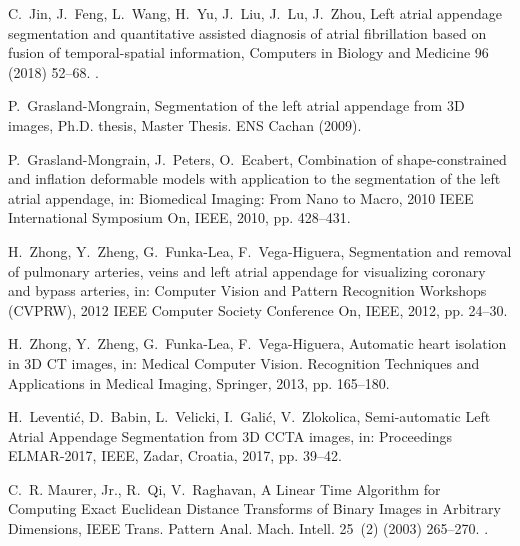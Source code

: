 \documentclass[review]{elsarticle}
\begin{document}
\begin{thebibliography}{10}
C.~Jin, J.~Feng, L.~Wang, H.~Yu, J.~Liu, J.~Lu, J.~Zhou, Left atrial appendage
  segmentation and quantitative assisted diagnosis of atrial fibrillation based
  on fusion of temporal-spatial information, Computers in Biology and Medicine
  96 (2018) 52--68.
\newblock \href {http://dx.doi.org/10.1016/j.compbiomed.2018.03.002}
  {}.

P.~{Grasland-Mongrain}, Segmentation of the left atrial appendage from {{3D}}
  images, Ph.D. thesis, Master Thesis. ENS Cachan (2009).

P.~{Grasland-Mongrain}, J.~Peters, O.~Ecabert, Combination of shape-constrained
  and inflation deformable models with application to the segmentation of the
  left atrial appendage, in: Biomedical {{Imaging}}: {{From Nano}} to
  {{Macro}}, 2010 {{IEEE International Symposium}} On, {IEEE}, 2010, pp.
  428--431.

H.~Zhong, Y.~Zheng, G.~{Funka-Lea}, F.~{Vega-Higuera}, Segmentation and removal
  of pulmonary arteries, veins and left atrial appendage for visualizing
  coronary and bypass arteries, in: Computer {{Vision}} and {{Pattern
  Recognition Workshops}} ({{CVPRW}}), 2012 {{IEEE Computer Society
  Conference}} On, {IEEE}, 2012, pp. 24--30.

H.~Zhong, Y.~Zheng, G.~{Funka-Lea}, F.~{Vega-Higuera}, Automatic heart
  isolation in {{3D CT}} images, in: Medical {{Computer Vision}}. {{Recognition
  Techniques}} and {{Applications}} in {{Medical Imaging}}, {Springer}, 2013,
  pp. 165--180.

H.~Leventi\'c, D.~Babin, L.~Velicki, I.~Gali\'c, V.~Zlokolica, Semi-automatic
  {{Left Atrial Appendage Segmentation}} from {{3D CCTA}} images, in:
  Proceedings {{ELMAR}}-2017, {IEEE}, Zadar, Croatia, 2017, pp. 39--42.

C.~R. Maurer, Jr., R.~Qi, V.~Raghavan, A {{Linear Time Algorithm}} for
  {{Computing Exact Euclidean Distance Transforms}} of {{Binary Images}} in
  {{Arbitrary Dimensions}}, IEEE Trans. Pattern Anal. Mach. Intell. 25~(2)
  (2003) 265--270.
\newblock \href {http://dx.doi.org/10.1109/TPAMI.2003.1177156}
  {}.


\end{thebibliography}
\end{document}
